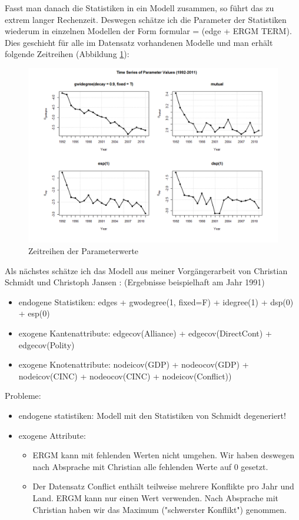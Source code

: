\documentclass[a4paper,ngerman,oneside,titlepage,bibliography=totoc,11pt]{scrreprt}
\begin{document}
Fasst man danach die Statistiken in ein Modell zusammen, so führt das zu extrem langer Rechenzeit. Deswegen schätze ich die Parameter der Statistiken wiederum in einzelnen Modellen der Form formular = (edge + ERGM TERM). Dies geschieht für alle im Datensatz vorhandenen Modelle und man erhält folgende Zeitreihen (Abbildung \ref{fig:ts_ERGM_coef}):


\begin{figure}[ht]
	\centering
		\includegraphics[width=1.00\textwidth]{Grafiken/ts_ERGM_coef.png}
	\caption{Zeitreihen der Parameterwerte}
	\label{fig:ts_ERGM_coef}
\end{figure}

Als nächstes schätze ich das Modell aus meiner Vorgängerarbeit von Christian Schmidt und Christoph Jansen \cite{js14}: (Ergebnisse beispielhaft am Jahr 1991)
\begin{itemize}
  \item endogene Statistiken: edges + gwodegree(1, fixed=F) + idegree(1) + dsp(0) + esp(0)
	\item exogene Kantenattribute: edgecov(Alliance) + edgecov(DirectCont)  + edgecov(Polity)
  \item exogene Knotenattribute: nodeicov(GDP) + nodeocov(GDP) + nodeicov(CINC) + nodeocov(CINC) + nodeicov(Conflict))
\end{itemize}

Probleme:
\begin{itemize}
\item endogene statistiken: Modell mit den Statistiken von Schmidt degeneriert!
\item exogene Attribute: 
  \begin{itemize} 
  \item ERGM kann mit fehlenden Werten nicht umgehen. Wir haben deswegen nach Absprache mit Christian alle fehlenden Werte auf 0 gesetzt.
  \item Der Datensatz Conflict enthält teilweise mehrere Konflikte pro Jahr und Land. ERGM kann nur einen Wert verwenden. Nach Absprache mit Christian haben wir das Maximum ("schwerster Konflikt") genommen.
  \end{itemize}
\end{itemize}
\end{document}
